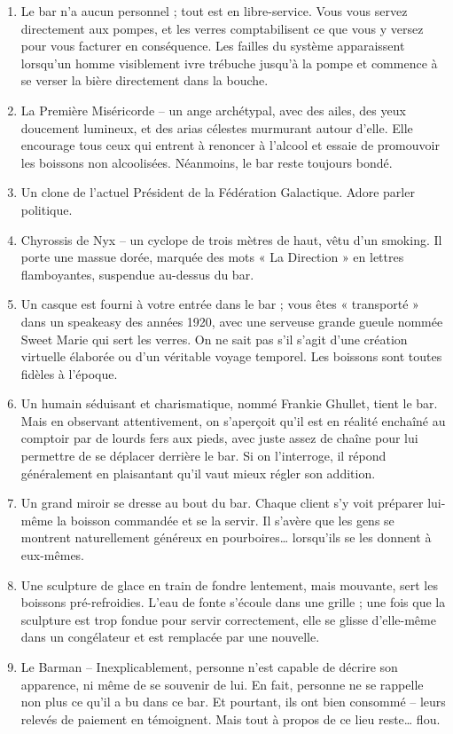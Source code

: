 \documentclass{article}
\begin{document}
\begin{enumerate}
	\item Le bar n’a aucun personnel ; tout est en libre-service. Vous vous servez directement aux pompes, et les verres comptabilisent ce que vous y versez pour vous facturer en conséquence. Les failles du système apparaissent lorsqu’un homme visiblement ivre trébuche jusqu’à la pompe et commence à se verser la bière directement dans la bouche.
	\item La Première Miséricorde – un ange archétypal, avec des ailes, des yeux doucement lumineux, et des arias célestes murmurant autour d’elle. Elle encourage tous ceux qui entrent à renoncer à l’alcool et essaie de promouvoir les boissons non alcoolisées. Néanmoins, le bar reste toujours bondé.
	\item Un clone de l’actuel Président de la Fédération Galactique. Adore parler politique.
	\item Chyrossis de Nyx – un cyclope de trois mètres de haut, vêtu d’un smoking. Il porte une massue dorée, marquée des mots « La Direction » en lettres flamboyantes, suspendue au-dessus du bar.
	\item Un casque est fourni à votre entrée dans le bar ; vous êtes « transporté » dans un speakeasy des années 1920, avec une serveuse grande gueule nommée Sweet Marie qui sert les verres. On ne sait pas s’il s’agit d’une création virtuelle élaborée ou d’un véritable voyage temporel. Les boissons sont toutes fidèles à l’époque.
	\item Un humain séduisant et charismatique, nommé Frankie Ghullet, tient le bar. Mais en observant attentivement, on s’aperçoit qu’il est en réalité enchaîné au comptoir par de lourds fers aux pieds, avec juste assez de chaîne pour lui permettre de se déplacer derrière le bar. Si on l’interroge, il répond généralement en plaisantant qu’il vaut mieux régler son addition.
	\item Un grand miroir se dresse au bout du bar. Chaque client s’y voit préparer lui-même la boisson commandée et se la servir. Il s’avère que les gens se montrent naturellement généreux en pourboires… lorsqu’ils se les donnent à eux-mêmes.
	\item Une sculpture de glace en train de fondre lentement, mais mouvante, sert les boissons pré-refroidies. L’eau de fonte s’écoule dans une grille ; une fois que la sculpture est trop fondue pour servir correctement, elle se glisse d’elle-même dans un congélateur et est remplacée par une nouvelle.
	\item Le Barman – Inexplicablement, personne n’est capable de décrire son apparence, ni même de se souvenir de lui. En fait, personne ne se rappelle non plus ce qu’il a bu dans ce bar. Et pourtant, ils ont bien consommé – leurs relevés de paiement en témoignent. Mais tout à propos de ce lieu reste… flou.

\end{enumerate}
\end{document}
